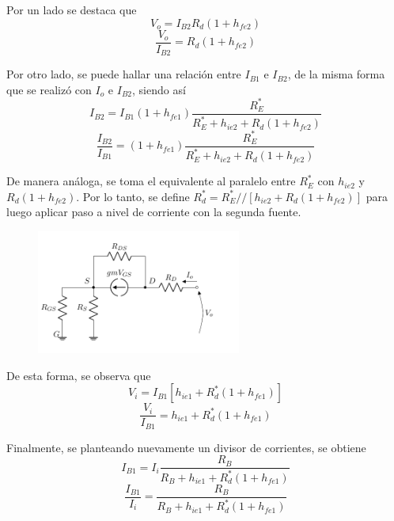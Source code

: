 Por un lado se destaca que 
\begin{equation*}
	V_o = I_{B2} R_d \left( 1 + h_{fe2} \right)
\end{equation*}
\begin{equation}
	\frac{V_o}{I_{B2}} = R_d \left( 1 + h_{fe2} \right)
\label{equ:vo-ib2}
\end{equation}

Por otro lado, se puede hallar una relación entre $I_{B1}$ e $I_{B2}$, de la misma forma que se realizó con $I_o$ e $I_{B2}$, siendo así
\begin{equation*}
	I_{B2} = I_{B1} \left( 1 + h_{fe1} \right) \frac{R_{E}^*}{ R_{E}^* + h_{ie2} + R_d \left( 1 + h_{fe2} \right) }
\end{equation*}
\begin{equation}
	\frac{I_{B2}}{I_{B1}} = \left( 1 + h_{fe1} \right) \frac{R_{E}^*}{ R_{E}^* + h_{ie2} + R_d \left( 1 + h_{fe2} \right) }
	\label{equ:ib2-ib1}
\end{equation}

De manera análoga, se toma el equivalente al paralelo entre $R_{E}^*$ con $h_{ie2}$ y $R_d \left( 1 + h_{fe2} \right)$. Por lo tanto, se define $R_{d}^* = R_{E}^* // \left[ h_{ie2} + R_d \left( 1 + h_{fe2} \right) \right]$ para luego aplicar paso a nivel de corriente con la segunda fuente.
\begin{figure}[H]
\centering
	\includegraphics[width=0.6\textwidth, page=6]{Imagenes/ModeloIncremental.pdf}
\end{figure}

De esta forma, se observa que
\begin{equation*}
	V_i = I_{B1} \left[ h_{ie1} + R_{d}^* \left( 1 + h_{fe1} \right) \right]
\end{equation*}
\begin{equation}
	\frac{V_i}{I_{B1}} = h_{ie1} + R_{d}^* \left( 1 + h_{fe1} \right)
	\label{equ:vi-ib1}
\end{equation}

Finalmente, se planteando nuevamente un divisor de corrientes, se obtiene
\begin{equation*}
	I_{B1} = I_i \frac{R_B}{R_B + h_{ie1} + R_{d}^* \left(1 + h_{fe1} \right)}
\end{equation*}
\begin{equation}
	\frac{I_{B1}}{I_i} = \frac{R_B}{R_B + h_{ie1} + R_{d}^* \left(1 + h_{fe1} \right)}
	\label{equ:ib1-ii}
\end{equation}

